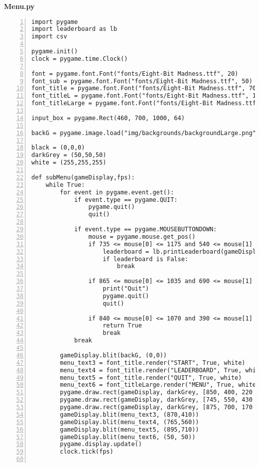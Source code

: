 \documentclass[12pt]{report}
\begin{document}
\textbf{Menu.py}
\tiny
\begin{Verbatim}[numbers=left, frame=single]
import pygame
import leaderboard as lb
import csv

pygame.init()                                                                               
clock = pygame.time.Clock()

font = pygame.font.Font("fonts/Eight-Bit Madness.ttf", 20)
font_sub = pygame.font.Font("fonts/Eight-Bit Madness.ttf", 50)
font_title = pygame.font.Font("fonts/Eight-Bit Madness.ttf", 70)
font_titleL = pygame.font.Font("fonts/Eight-Bit Madness.ttf", 100)
font_titleLarge = pygame.font.Font("fonts/Eight-Bit Madness.ttf", 150)

input_box = pygame.Rect(460, 700, 1000, 64)                                                  

backG = pygame.image.load("img/backgrounds/backgroundLarge.png")

black = (0,0,0)
darkGrey = (50,50,50)
white = (255,255,255)

def subMenu(gameDisplay,fps):
    while True:
        for event in pygame.event.get():
            if event.type == pygame.QUIT:
                pygame.quit()
                quit()

            if event.type == pygame.MOUSEBUTTONDOWN:
                mouse = pygame.mouse.get_pos()
                if 735 <= mouse[0] <= 1175 and 540 <= mouse[1] <= 620:
                    leaderboard = lb.printLeaderboard(gameDisplay,fps)
                    if leaderboard is False:
                        break

                if 865 <= mouse[0] <= 1035 and 690 <= mouse[1] <= 770:
                    print("Quit")
                    pygame.quit()
                    quit()

                if 840 <= mouse[0] <= 1070 and 390 <= mouse[1] <= 470:
                    return True
                    break
            break

        gameDisplay.blit(backG, (0,0))
        menu_text3 = font_title.render("START", True, white)
        menu_text4 = font_title.render("LEADERBOARD", True, white)
        menu_text5 = font_title.render("QUIT", True, white)
        menu_text6 = font_titleLarge.render("MENU", True, white)
        pygame.draw.rect(gameDisplay, darkGrey, [850, 400, 220 , 60])
        pygame.draw.rect(gameDisplay, darkGrey, [745, 550, 430 , 60])
        pygame.draw.rect(gameDisplay, darkGrey, [875, 700, 170 , 60])
        gameDisplay.blit(menu_text3, (870,410))
        gameDisplay.blit(menu_text4, (765,560))
        gameDisplay.blit(menu_text5, (895,710))
        gameDisplay.blit(menu_text6, (50, 50))
        pygame.display.update()                                                                 
        clock.tick(fps)


\end{Verbatim}
\end{document}
